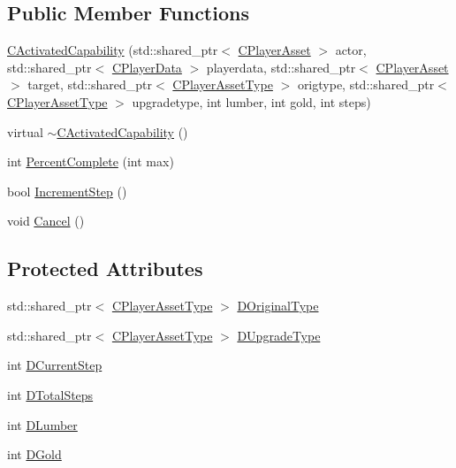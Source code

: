 \subsection*{Public Member Functions}
\begin{DoxyCompactItemize}
\item 
\hyperlink{classCPlayerCapabilityBuildingUpgrade_1_1CActivatedCapability_ab0e141246d8b14ba86cbb3146afcf319}{C\+Activated\+Capability} (std\+::shared\+\_\+ptr$<$ \hyperlink{classCPlayerAsset}{C\+Player\+Asset} $>$ actor, std\+::shared\+\_\+ptr$<$ \hyperlink{classCPlayerData}{C\+Player\+Data} $>$ playerdata, std\+::shared\+\_\+ptr$<$ \hyperlink{classCPlayerAsset}{C\+Player\+Asset} $>$ target, std\+::shared\+\_\+ptr$<$ \hyperlink{classCPlayerAssetType}{C\+Player\+Asset\+Type} $>$ origtype, std\+::shared\+\_\+ptr$<$ \hyperlink{classCPlayerAssetType}{C\+Player\+Asset\+Type} $>$ upgradetype, int lumber, int gold, int steps)
\item 
virtual \hyperlink{classCPlayerCapabilityBuildingUpgrade_1_1CActivatedCapability_a559f4334174ff6deb2cdbc7bee013e61}{$\sim$\+C\+Activated\+Capability} ()
\item 
int \hyperlink{classCPlayerCapabilityBuildingUpgrade_1_1CActivatedCapability_afb2aab171773fa9f33539e33315c1c28}{Percent\+Complete} (int max)
\item 
bool \hyperlink{classCPlayerCapabilityBuildingUpgrade_1_1CActivatedCapability_acc732144e87e5fc88117c0b3a032a97a}{Increment\+Step} ()
\item 
void \hyperlink{classCPlayerCapabilityBuildingUpgrade_1_1CActivatedCapability_adca97e7f7611f4adfcfea615428dac0b}{Cancel} ()
\end{DoxyCompactItemize}
\subsection*{Protected Attributes}
\begin{DoxyCompactItemize}
\item 
std\+::shared\+\_\+ptr$<$ \hyperlink{classCPlayerAssetType}{C\+Player\+Asset\+Type} $>$ \hyperlink{classCPlayerCapabilityBuildingUpgrade_1_1CActivatedCapability_a9418eb8f3401f341c688f00cf8c4aa53}{D\+Original\+Type}
\item 
std\+::shared\+\_\+ptr$<$ \hyperlink{classCPlayerAssetType}{C\+Player\+Asset\+Type} $>$ \hyperlink{classCPlayerCapabilityBuildingUpgrade_1_1CActivatedCapability_a625885c25af00ac23b85f95fc44f897d}{D\+Upgrade\+Type}
\item 
int \hyperlink{classCPlayerCapabilityBuildingUpgrade_1_1CActivatedCapability_a70e4e67d8115643f7ffa11dc72fcf63c}{D\+Current\+Step}
\item 
int \hyperlink{classCPlayerCapabilityBuildingUpgrade_1_1CActivatedCapability_a9c4ea12cf99701f8ce38e17e03ad0115}{D\+Total\+Steps}
\item 
int \hyperlink{classCPlayerCapabilityBuildingUpgrade_1_1CActivatedCapability_a497437c6eb755ccc9b18ff2a1e704c72}{D\+Lumber}
\item 
int \hyperlink{classCPlayerCapabilityBuildingUpgrade_1_1CActivatedCapability_a86bea8030ade6995b4bb5b253fe9466c}{D\+Gold}
\end{DoxyCompactItemize}


